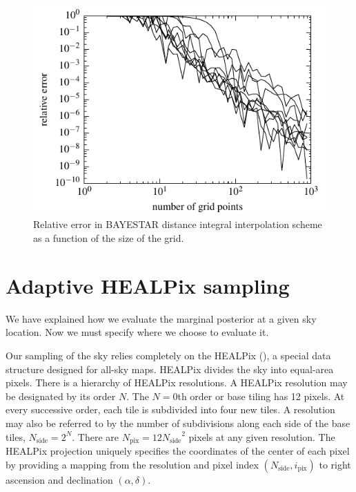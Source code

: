 \documentclass[amsmath,amssymb,aps,prx,reprint,nopreprintnumbers,nofootinbib,showpacs]{revtex4-1}
\begin{document}
\begin{figure}
    \begin{center}
        \includegraphics[width=\columnwidth]{distance_interpolant_convergence}
    \end{center}
    \caption{\label{fig:distance_interpolant_convergence}Relative error in \ac{BAYESTAR} distance integral interpolation scheme as a function of the size of the grid.}
\end{figure}

\section{Adaptive HEALPix sampling}
\label{sec:adaptive-sampling}

We have explained how we evaluate the marginal posterior at a given sky location. Now we must specify where we choose to evaluate it.

Our sampling of the sky relies completely on the \acl{HEALPix} (), a special data structure designed for all\nobreakdashes-sky maps. \ac{HEALPix} divides the sky into equal\nobreakdashes-area pixels. There is a hierarchy of \ac{HEALPix} resolutions. A \ac{HEALPix} resolution may be designated by its order $N$. The $N=0$th order or base tiling has 12 pixels. At every successive order, each tile is subdivided into four new tiles. A resolution may also be referred to by the number of subdivisions along each side of the base tiles, $N_\mathrm{side} = 2^N$. There are $N_\mathrm{pix} = 12 {N_\mathrm{side}}^2$ pixels at any given resolution. The \ac{HEALPix} projection uniquely specifies the coordinates of the center of each pixel by providing a mapping from the resolution and pixel index $(N_\mathrm{side}, i_\mathrm{pix})$ to right ascension and declination $(\alpha, \delta)$.
\end{document}
